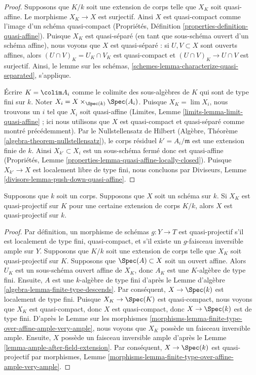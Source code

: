 \begin{proof}
Supposons que $K/k$ soit une extension de corps telle que $X_K$ soit
quasi-affine. Le morphisme $X_K \to X$ est surjectif. Ainsi $X$ est
quasi-compact comme l'image d'un schéma quasi-compact (Propriétés,
Définition \ref{properties-definition-quasi-affine}). Puisque $X_K$
est quasi-séparé (en tant que sous-schéma ouvert d'un schéma affine),
nous voyons que $X$ est quasi-séparé : si $U, V \subset X$ sont
ouverts affines, alors $(U \cap V)_K = U_K \cap V_K$ est quasi-compact
et $(U \cap V)_K \to U \cap V$ est surjectif. Ainsi, le lemme sur les
schémas, \ref{schemes-lemma-characterize-quasi-separated}, s'applique.

\medskip\noindent
Écrire $K = \colim A_i$ comme le colimite des
sous-algèbres de $K$ qui sont de type fini sur $k$. Noter
$X_i = X \times_{\Spec(k)} \Spec(A_i)$. Puisque $X_K = \lim
X_i$, nous trouvons un $i$ tel que $X_i$ soit quasi-affine
(Limites, Lemme \ref{limits-lemma-limit-quasi-affine} ; ici
nous utilisons que $X$ est quasi-compact et quasi-séparé
comme montré précédemment). Par le Nullstellensatz de
Hilbert (Algèbre, Théorème
\ref{algebra-theorem-nullstellensatz}), le corps résiduel $k' =
A_i/\mathfrak m$ est une extension finie de $k$. Ainsi $X_{k'}
\subset X_i$ est un sous-schéma fermé donc est quasi-affine
(Propriétés, Lemme
\ref{properties-lemma-quasi-affine-locally-closed}). Puisque $X_{k'} \to X$ est localement libre
de type fini, nous concluons par Diviseurs, Lemme \ref{divisors-lemma-push-down-quasi-affine}.
\end{proof}

\begin{lemma}
\label{lemma-quasi-projective-after-field-extension}
Supposons que $k$ soit un corps. Supposons que $X$ soit un schéma
sur $k$. Si $X_K$ est quasi-projectif sur $K$ pour une certaine
extension de corps $K/k$, alors $X$ est quasi-projectif sur $k$.
\end{lemma}

\begin{proof}
Par définition, un morphisme de schémas $g : Y \to T$ est
quasi-projectif s'il est localement de type fini, quasi-compact,
et s'il existe un $g$-faisceau inversible ample sur $Y$.
Supposons que $K/k$ soit une extension de corps telle que $X_K$
soit quasi-projectif sur $K$. Supposons que $\Spec(A) \subset X$
soit un ouvert affine. Alors $U_K$ est un sous-schéma ouvert
affine de $X_K$, donc $A_K$ est une $K$-algèbre de type fini.
Ensuite, $A$ est une $k$-algèbre de type fini d'après le Lemme
d'algèbre \ref{algebra-lemma-finite-type-descends}. Par conséquent,
$X \to \Spec(k)$ est localement de type fini. Puisque $X_K \to
\Spec(K)$ est quasi-compact, nous voyons que $X_K$ est
quasi-compact, donc $X$ est quasi-compact, donc $X \to \Spec(k)$ est
de type fini. D'après le Lemme sur les morphismes
\ref{morphisms-lemma-finite-type-over-affine-ample-very-ample}, nous
voyons que $X_K$ possède un faisceau inversible ample. Ensuite, $X$ possède
un faisceau inversible ample d'après le Lemme
\ref{lemma-ample-after-field-extension}. Par conséquent, $X \to \Spec(k)$ est
quasi-projectif par morphismes, Lemme \ref{morphisms-lemma-finite-type-over-affine-ample-very-ample}.
\end{proof}

